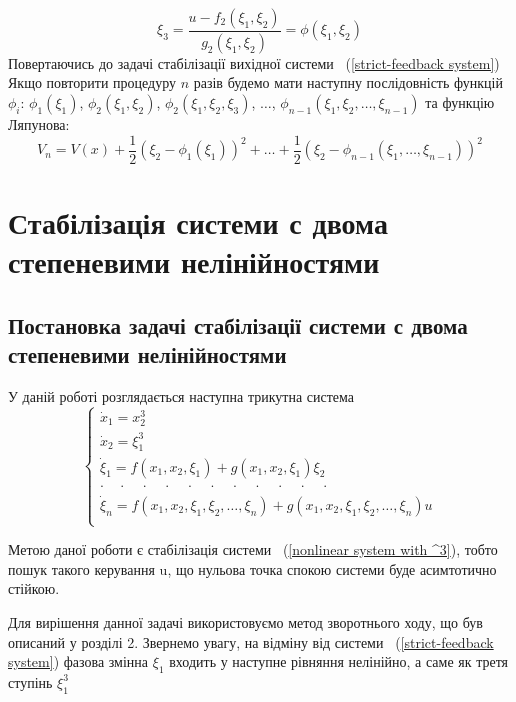 \documentclass{article}
\begin{document}
\begin{equation}
    \xi_3 = \frac{u - f_2(\xi_1, \xi_2)}{g_2(\xi_1, \xi_2)} = \phi(\xi_1,\xi_2)
\end{equation}
Повертаючись до задачі стабілізації вихідної системи ~(\ref{strict-feedback system})
Якщо повторити процедуру $n$ разів будемо мати наступну послідовність функцій $\phi_i$:
$\phi_1(\xi_1)$, $\phi_2(\xi_1,\xi_2)$, $\phi_2(\xi_1,\xi_2,\xi_3)$, $\dots$,
$\phi_{n-1}(\xi_1,\xi_2, \dots, \xi_{n-1})$
та функцію Ляпунова:
\begin{equation}
    V_n = V(x)+\frac{1}{2}(\xi_2-\phi_1(\xi_1))^2 + \dots 
    +\frac{1}{2}(\xi_2-\phi_{n-1}(\xi_1, \dots, \xi_{n-1}))^2
\end{equation}

\pagebreak
\section{Стабілізація системи с двома степеневими нелінійностями}
\subsection{Постановка задачі стабілізації системи с двома степеневими нелінійностями}
У даній роботі розглядається наступна трикутна система
\begin{equation}\label{nonlinear system with ^3}
    \begin{cases}
    \dot x_1 = x_2^3 \\
    \dot x_2 = \xi_1^3\\
    \dot \xi_1 = f(x_1, x_2,\xi_1) + g(x_1, x_2, \xi_1)\xi_2 \\
    \cdot \quad \cdot \quad \cdot \quad \cdot  \quad \cdot  \quad \cdot
    \quad \cdot  \quad \cdot  \quad \cdot  \quad \cdot  \quad \cdot\\
    \dot \xi_n = f(x_1, x_2,\xi_1,\xi_2, \dots, \xi_n) + 
    g(x_1, x_2, \xi_1,\xi_2, \dots, \xi_n)u \\
    \end{cases}
\end{equation}

Метою даної роботи є стабілізація системи ~(\ref{nonlinear system with ^3}), тобто пошук такого
керування u, що нульова точка спокою системи буде асимтотично стійкою. 

Для вирішення данної задачі
використовуємо метод зворотнього ходу, що був описаний у розділі 2. Звернемо увагу, на відміну від 
системи ~(\ref{strict-feedback system}) фазова змінна $\xi_1$ входить у наступне рівняння нелінійно,
а саме як третя ступінь $\xi_1^3$
\pagebreak
\end{document}
